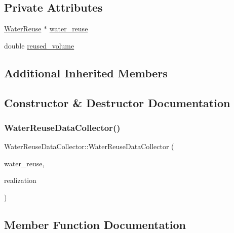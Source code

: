 \subsection*{Private Attributes}
\begin{DoxyCompactItemize}
\item 
\mbox{\hyperlink{classWaterReuse}{Water\+Reuse}} $\ast$ \mbox{\hyperlink{classWaterReuseDataCollector_a4ecf7e2de50415ac298104816b17d887_a4ecf7e2de50415ac298104816b17d887}{water\+\_\+reuse}}
\item 
double \mbox{\hyperlink{classWaterReuseDataCollector_a9c119c103524f7350d771406a4a8c6a9_a9c119c103524f7350d771406a4a8c6a9}{reused\+\_\+volume}}
\end{DoxyCompactItemize}
\subsection*{Additional Inherited Members}


\subsection{Constructor \& Destructor Documentation}
\mbox{\label{classWaterReuseDataCollector_a0bd64f585d6645023f6cf5a485a89416_a0bd64f585d6645023f6cf5a485a89416}} 
\subsubsection{\texorpdfstring{Water\+Reuse\+Data\+Collector()}{WaterReuseDataCollector()}}
{\footnotesize\ttfamily Water\+Reuse\+Data\+Collector\+::\+Water\+Reuse\+Data\+Collector (\begin{DoxyParamCaption}\item[{\mbox{\hyperlink{classWaterReuse}{Water\+Reuse}} $\ast$}]{water\+\_\+reuse,  }\item[{unsigned long}]{realization }\end{DoxyParamCaption})}



\subsection{Member Function Documentation}
\mbox{\label{classWaterReuseDataCollector_af4d8d437372c06d84ff889a5288cc96e_af4d8d437372c06d84ff889a5288cc96e}} 
